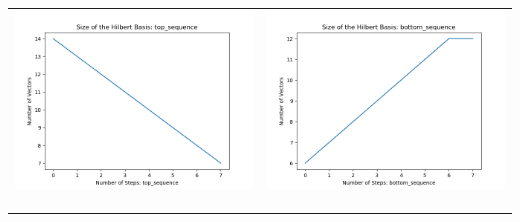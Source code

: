 \documentclass[10pt]{article}
\begin{document}
\begin{tabular}{c|c}
\begin{minipage}{.4\textwidth}
\includegraphics[width=\textwidth]{"DATA/5d/5 generators 2 bound A/top_sequence SIZE"}
\end{minipage} &
\begin{minipage}{.4\textwidth}
\includegraphics[width=\textwidth]{"DATA/5d/5 generators 2 bound A bottomup/bottom_sequence SIZE"}
\end{minipage} \\ \\
\hline \\\begin{minipage}{.4\textwidth}

\end{minipage}
\end{tabular}
\end{document}
